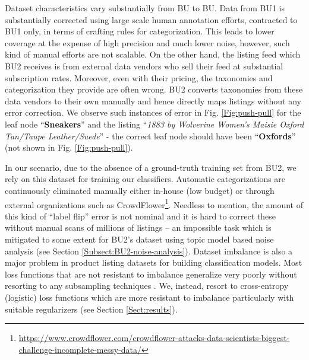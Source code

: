 Dataset characteristics vary substantially from BU to BU.
Data from BU1 is substantially corrected using large scale human annotation efforts, contracted to BU1 only, in terms of crafting rules for categorization.
This leads to lower coverage at the expense of high precision and much lower noise, however, such kind of manual efforts are not scalable.
On the other hand, the listing feed which BU2 receives is from external data vendors who sell their feed at substantial subscription rates. 
Moreover, even with their pricing, the taxonomies and categorization they provide are often wrong.
BU2 converts taxonomies from these data vendors to their own manually and hence directly maps listings without any error correction.
We observe such instances of error in Fig. \ref{Fig:push-pull} for the leaf node ``\textbf{Sneakers}'' and the listing ``\textit{1883 by Wolverine Women's Maisie Oxford Tan/Taupe Leather/Suede}'' - the correct leaf node should have been ``\textbf{Oxfords}'' (not shown in Fig. \ref{Fig:push-pull}).

In our scenario, due to the absence of a ground-truth training set from BU2, we rely on this dataset for training our classifiers. 
Automatic categorizations are continuously eliminated manually either in-house (low budget) or through external organizations such as CrowdFlower\footnote{\scriptsize{\url{https://www.crowdflower.com/crowdflower-attacks-data-scientists-biggest-challenge-incomplete-messy-data/}}}.
Needless to mention, the amount of this kind of ``label flip'' error is not nominal and it is hard to correct these without manual scans of millions of listings -- an impossible task which is mitigated to some extent for BU2's dataset using topic model based noise analysis (see Section \ref{Subsect:BU2-noise-analysis}).
Dataset imbalance is also a major problem in product listing datasets for building classification models.
Most loss functions that are not resistant to imbalance generalize very poorly without resorting to any subsampling techniques \cite{Chawla02:SMOTE}. 
We, instead, resort to cross-entropy (logistic) loss functions which are more resistant to imbalance particularly with suitable regularizers (see Section \ref{Sect:results}). 

